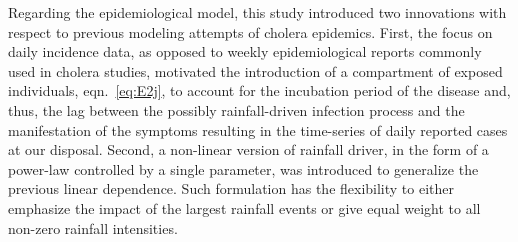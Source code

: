 Regarding the epidemiological model, this study introduced two innovations with respect to previous modeling attempts of cholera epidemics\cite{Bertuzzo:ProbabilityExtinctionHaiti:2016,Pasetto:RealtimeProjectionsCholera:2017}. First, the focus on daily incidence data, as opposed to weekly epidemiological reports commonly used in cholera studies, motivated the introduction of a compartment of exposed individuals, eqn.~\eqref{eq:E2j}, to account for the incubation period of the disease and, thus, the lag between the possibly rainfall-driven infection process and the manifestation of the symptoms resulting in the time-series of daily reported cases at our disposal. %
Second, a non-linear version of rainfall driver, in the form of a power-law controlled by a single parameter, was introduced to generalize the previous linear dependence. Such formulation has the flexibility to either emphasize the impact of the largest rainfall events or give equal weight to all non-zero rainfall intensities. %

